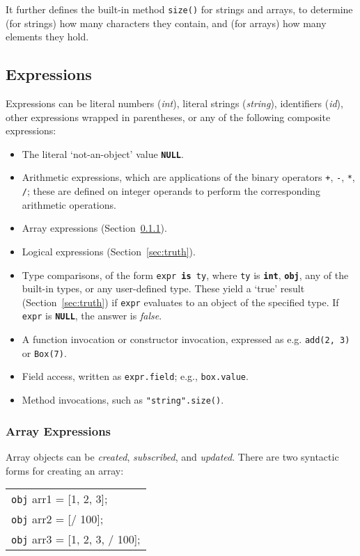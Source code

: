 \documentclass[11pt,a4paper]{article}
\newenvironment{slisting}{%
        \begin{tt}%
        \begin{tabular}{l}%
        }
        {%
        \end{tabular}%
        \end{tt}%
        }
\newcommand{\Cty}[1]{\textcolor{dblue}{\texttt{#1}}}
\newcommand{\Ckw}[1]{\textbf{\texttt{#1}}}
\begin{document}
It further defines the built-in method \texttt{size()} for strings and arrays, to determine (for strings)
how many characters they contain, and (for arrays) how many elements they hold.

\subsection{Expressions}
Expressions can be literal numbers (\textit{int}), literal strings (\textit{string}), identifiers (\textit{id}),
other expressions wrapped in parentheses, or any of the following composite expressions:
\begin{itemize}
\item The literal `not-an-object' value \Ckw{NULL}.
\item Arithmetic expressions, which are applications of the binary operators \texttt{+}, \texttt{-}, \texttt{*}, \texttt{/};
  these are defined on integer operands to perform the corresponding arithmetic operations.
\item Array expressions (Section~\ref{sec:arrays}).
\item Logical expressions (Section~\ref{sec:truth}).
\item Type comparisons, of the form \texttt{expr \Ckw{is} \Cty{ty}}, where \Cty{ty} is \Ckw{int}, \Ckw{obj},
  any of the built-in types, or any user-defined type.  These yield a `true' result (Section~\ref{sec:truth}) if
  \texttt{expr} evaluates to an object of the specified type.  If \texttt{expr} is \Ckw{NULL}, the answer is \emph{false}.
\item A function invocation or constructor invocation, expressed as e.g. \texttt{add(2, 3)} or \texttt{Box(7)}.
\item Field access, written as \texttt{expr.field}; e.g., \texttt{box.value}.
\item Method invocations, such as \texttt{"string".size()}.
\end{itemize}

\subsubsection{Array Expressions}\label{sec:arrays}
Array objects can be \emph{created}, \emph{subscribed}, and \emph{updated}.  There are two
syntactic forms for creating an array:

\begin{slisting}
\Cty{obj} arr1 = [1, 2, 3];\\
\Cty{obj} arr2 = [/ 100];\\
\Cty{obj} arr3 = [1, 2, 3, / 100];\\
\end{slisting}
\end{document}
